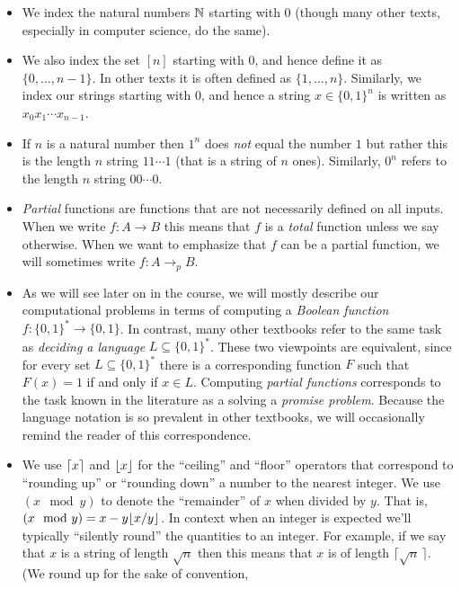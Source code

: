 \begin{itemize}
\item
  We index the natural numbers \({\mathbb{N}}\) starting with \(0\) (though many
  other texts, especially in computer science, do the same).
\item
  We also index the set \([n]\) starting with \(0\), and hence define it
  as \(\{0,\ldots,n-1\}\). In other texts it is often defined as
  \(\{1,\ldots, n \}\). Similarly, we index our strings starting with
  \(0\), and hence a string \(x\in \{0,1\}^n\) is written as
  \(x_0x_1\cdots x_{n-1}\).
\item
  If \(n\) is a natural number then \(1^n\) does \emph{not} equal the
  number \(1\) but rather this is the length \(n\) string \(11\cdots 1\)
  (that is a string of \(n\) ones). Similarly, \(0^n\) refers to the
  length \(n\) string \(00 \cdots 0\).
\item
  \emph{Partial} functions are functions that are not necessarily
  defined on all inputs. When we write \(f:A \rightarrow B\) this means
  that \(f\) is a \emph{total} function unless we say otherwise. When we
  want to emphasize that \(f\) can be a partial function, we will
  sometimes write \(f: A \rightarrow_p B\).
\item
  As we will see later on in the course, we will mostly describe our
  computational problems in terms of computing a \emph{Boolean function}
  \(f: \{0,1\}^* \rightarrow \{0,1\}\). In contrast, many other
  textbooks refer to the same task as \emph{deciding a language}
  \(L \subseteq \{0,1\}^*\). These two viewpoints are equivalent, since
  for every set \(L\subseteq \{0,1\}^*\) there is a corresponding
  function \(F\) such that \(F(x)=1\) if and only if \(x\in L\).
  Computing \emph{partial functions} corresponds to the task known in
  the literature as a solving a \emph{promise problem}. Because the
  language notation is so prevalent in other textbooks, we will
  occasionally remind the reader of this correspondence.
\item
  We use \(\lceil x \rceil\) and \(\lfloor x \rfloor\) for the ``ceiling'' and
  ``floor'' operators that correspond to ``rounding up'' or ``rounding
  down'' a number to the nearest integer. We use \((x \mod y)\) to
  denote the ``remainder'' of \(x\) when divided by \(y\). That is,
  \((x \mod y) = x - y\lfloor x/y \rfloor\). In context when an integer is
  expected we'll typically ``silently round'' the quantities to an
  integer. For example, if we say that \(x\) is a string of length
  \(\sqrt{n}\) then this means that \(x\) is of length
  \(\lceil \sqrt{n}\, \rceil\). (We round up for the sake of convention,

\end{itemize}
